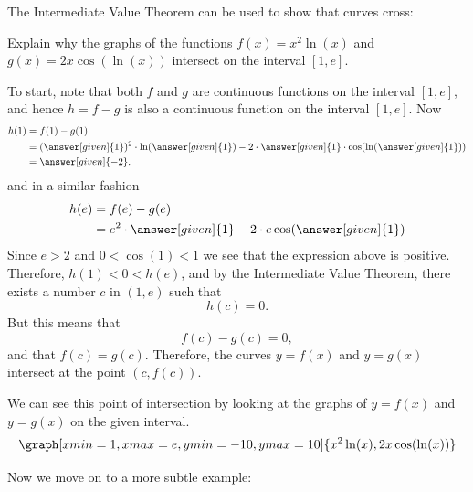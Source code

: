 \documentclass{ximera}
\begin{document}
The Intermediate Value Theorem can be used to show that curves cross:

\begin{example} 
	Explain why the graphs of the functions $f(x) = x^2\ln(x)$  and $ g(x) = 2x\cos(\ln(x))$ intersect on the interval $[1,e]$.
	\begin{explanation}
		  To start, note that both $f$ and $g$ are continuous functions on the interval $[1,e]$, and
		  hence $h = f-g$ is also a continuous function on the interval $[1,e]$. Now
		  \begin{align*}
		    h(1) &= f(1) - g(1) \\
		    &= (\answer[given]{1})^2\cdot \ln(\answer[given]{1}) - 2\cdot\answer[given]{1}\cdot \cos(\ln(\answer[given]{1}))\\
		    &= \answer[given]{-2}.
		  \end{align*}
		  and in a similar fashion
		   \begin{align*}
		    h(e) &= f(e) - g(e) \\
		    &= e^2\cdot \answer[given]{1} - 2\cdot e\cos(\answer[given]{1})
		   \end{align*}
		   Since $e>2$ and $0 < \cos(1)<1$ we see that the expression above is
		   positive. Therefore, $h(1)<0<h(e)$, and by the Intermediate Value Theorem, there exists a number $c$ in $(1,e)$ such that
		  \[h(c)=0.\]
		    But this means that 
		    \[ f(c)-g(c)=0, \]
		  and that $f(c)=g(c)$.
		  Therefore, the curves $y=f(x)$ and $y=g(x)$ intersect at the point $(c,f(c))$.
		  
		   \begin{onlineOnly}
		   We can see this point of intersection by looking at the graphs of $y=f(x)$ and $y=g(x)$ on the given interval. 
		   \[
		   \graph[xmin=1,xmax=e,ymin=-10,ymax=10]{x^2\ln(x), 2x\cos(\ln(x))}
		   \]
		   \end{onlineOnly}
  	\end{explanation}
\end{example}

Now we move on to a more subtle example:
\end{document}
